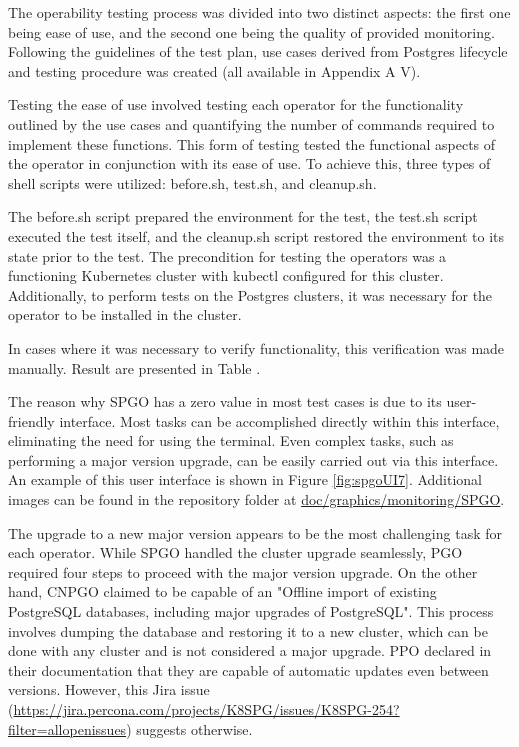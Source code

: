 \label{chap:operability}

The operability testing process was divided into two distinct aspects: the first one
being ease of use, and the second one being the quality of provided monitoring.
Following the guidelines of the test plan, use cases derived from Postgres lifecycle and testing procedure was created (all available in Appendix A V).

\label{chap:easeOfUse}
Testing the ease of use involved testing each operator for the functionality outlined by the use cases and quantifying the number of commands required to implement these functions.
This form of testing tested the functional aspects of the operator in conjunction with its ease of use.
To achieve this, three types of shell scripts were utilized: before.sh, test.sh, and cleanup.sh.

The before.sh script prepared the environment for the test, the test.sh script executed the test itself, and the cleanup.sh script restored the environment to its state prior to the test.
The precondition for testing the operators was a functioning Kubernetes cluster with kubectl configured for this cluster.
Additionally, to perform tests on the Postgres clusters, it was necessary for the operator to be installed in the cluster.

In cases where it was necessary to verify functionality, this verification was made manually. Result are presented in Table .

The reason why SPGO has a zero value in most test cases is due to its user-friendly interface.
Most tasks can be accomplished directly within this interface, eliminating the need for using the terminal.
Even complex tasks, such as performing a major version upgrade, can be easily carried out via this interface.
An example of this user interface is shown in Figure \ref{fig:spgoUI7}.
Additional images can be found in the repository folder at \url{doc/graphics/monitoring/SPGO}.


The upgrade to a new major version appears to be the most challenging task for each operator. While SPGO handled the cluster upgrade seamlessly, PGO required four steps to proceed with the major version upgrade. On the other hand, CNPGO claimed to be capable of an "Offline import of existing PostgreSQL databases, including major upgrades of PostgreSQL". This process involves dumping the database and restoring it to a new cluster, which can be done with any cluster and is not considered a major upgrade. PPO declared in their documentation that they are capable of automatic updates even between versions. However, this Jira issue (\url{https://jira.percona.com/projects/K8SPG/issues/K8SPG-254?filter=allopenissues}) suggests otherwise.


